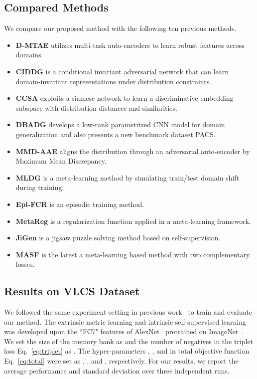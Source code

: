 \subsection{Compared Methods}
We compare our proposed method with the following ten previous methods.
\begin{itemize}
	\item \textbf{D-MTAE} \cite{ghifary2015domain} utilizes multi-task auto-encoders to learn robust features across domains.
	\item \textbf{CIDDG} \cite{li2018deep} is a conditional invariant adversarial network that can learn domain-invariant representations under distribution constraints.
	\item \textbf{CCSA} \cite{motiian2017unified} exploits
	a siamese network to learn a discriminative embedding subspace with distribution distances and similarities.
	\item \textbf{DBADG} \cite{li2017deeper} develops a low-rank parametrized CNN model for domain generalization and also presents a new benchmark dataset PACS.
	\item \textbf{MMD-AAE} \cite{li2018domain} aligns the distribution through an adversarial auto-encoder by Maximum Mean
	Discrepancy.
	\item \textbf{MLDG} \cite{li2018learning} is a meta-learning method by simulating train/test domain shift during training.
	\item \textbf{Epi-FCR} \cite{li2019episodic} is an episodic training method.
	\item \textbf{MetaReg} \cite{balaji2018metareg} is a regularization function applied in a meta-learning framework.
	\item \textbf{JiGen} \cite{carlucci2019domain} is a jigsaw puzzle solving method based on self-supervision. 
	\item \textbf{MASF} \cite{dou2019domain} is the latest a meta-learning based method with two complementary losses.
\end{itemize}
\fi 

\subsection{Results on VLCS Dataset}
We followed the same experiment setting in previous work~\cite{carlucci2019domain} to train and evaluate our method.
The extrinsic metric learning and intrinsic self-supervised learning was developed upon the ``FC7" features of AlexNet~\cite{NIPS2012_4824} pretrained on ImageNet~\cite{deng2009imagenet}.
We set the size of the memory bank as  and the number of negatives  in the triplet loss Eq.~\eqref{eq:triplet} as .
The hyper-parameters , , and  in total objective function Eq.~\eqref{eq:total} were set as , , and , respectively.
For our results, we report the average performance and standard deviation over three independent runs.



